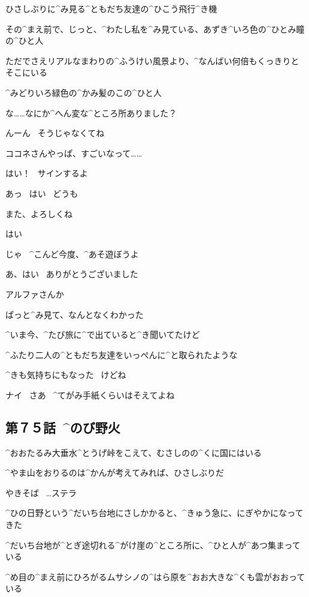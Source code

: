 \page[127]
\R ひさしぶりに^{み}{見}る^{ともだち}{友達}の^{ひこう}{飛行}^{き}{機}

\R その^{まえ}{前}で、じっと、^{わたし}{私}を^{み}{見}ている、あずき^{いろ}{色}の^{ひとみ}{瞳}の^{ひと}{人}

\R ただでさえリアルなまわりの^{ふうけい}{風景}より、^{なんばい}{何倍}もくっきりとそこにいる

\R ^{みどりいろ}{緑色}の^{かみ}{髪}のこの^{ひと}{人}

\page
\K な……なにか^{へん}{変}な^{ところ}{所}ありました？

\R んーん
\ そうじゃなくてね

\R ココネさんやっぱ、すごいなって……

\R はい！
\ サインするよ

\K あっ
\ はい
\ どうも

\page
\R また、よろしくね

\K はい

\R じゃ
\ ^{こんど}{今度}、^{あそ}{遊}ぼうよ

\K あ、はい
\ ありがとうございました

\page
\R アルファさんか

\R ぱっと^{み}{見}て、なんとなくわかった

\R ^{いま}{今}、^{たび}{旅}に^{で}{出}ていると^{き}{聞}いてたけど

\page
\R ^{ふたり}{二人}の^{ともだち}{友達}をいっぺんに^{と}{取}られたような

\R ^{きも}{気持}ちにもなった
\ けどね

\page
\R ナイ
\ さあ
\ ^{てがみ}{手紙}くらいはそえてよね


\subsection{第７５話\ ^{のび}{野火}}

\page[134]
\A ^{おおたるみ}{大垂水}^{とうげ}{峠}をこえて、むさしのの^{くに}{国}にはいる

\A ^{やま}{山}をおりるのは^{かんが}{考}えてみれば、ひさしぶりだ

\page
\Sign やきそば
\ …ステラ

\A ^{ひの}{日野}という^{だいち}{台地}にさしかかると、^{きゅう}{急}に、にぎやかになってきた

\A ^{だいち}{台地}が^{とぎ}{途切}れる^{がけ}{崖}の^{ところ}{所}に、^{ひと}{人}が^{あつ}{集}まっている

\page
\A ^{め}{目}の^{まえ}{前}にひろがるムサシノの^{はら}{原}を^{おお}{大}きな^{くも}{雲}がおおっている

